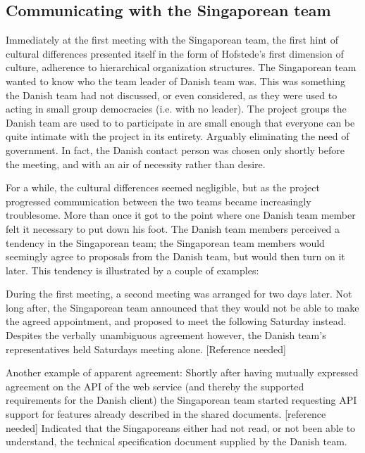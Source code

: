 \subsection{Communicating with the Singaporean team}
\label{sec:communicating}

Immediately at the first meeting with the Singaporean team, the first hint of
cultural differences presented itself in the form of Hofstede's first dimension
of culture, adherence to hierarchical organization structures\cite{surprises}.
The Singaporean team wanted to know who the team leader of Danish team was.
This was something the Danish team had not discussed, or even considered, as
they were used to acting in small group democracies (i.e. with no leader). The
project groups the Danish team are used to to participate in are small enough
that everyone can be quite intimate with the project in its entirety. Arguably
eliminating the need of government. In fact, the Danish contact person was
chosen only shortly before the meeting, and with an air of necessity rather
than desire.

For a while, the cultural differences seemed negligible, but as the project
progressed communication between the two teams became increasingly troublesome.
More than once it got to the point where one Danish team member felt it necessary
to put down his foot\cite{enough}. The Danish team members perceived a tendency in the Singaporean
team; the Singaporean team members would seemingly agree to proposals from the Danish team, but
would then turn on it later. This tendency is illustrated by a couple of
examples:

During the first meeting, a second meeting was arranged for two days later. Not
long after, the Singaporean team announced that they would not be able to make the
agreed appointment, and proposed to meet the following Saturday instead.
Despites the verbally unambiguous agreement however, the Danish team's
representatives held Saturdays meeting alone. [Reference needed]

Another example of apparent agreement: Shortly after having mutually expressed
agreement on the API of the web service (and thereby the supported requirements
for the Danish client) the Singaporean team started requesting API support for features
already described in the shared documents. [reference needed] Indicated that
the Singaporeans either had not read, or not been able to understand, the technical
specification document supplied by the Danish team.

